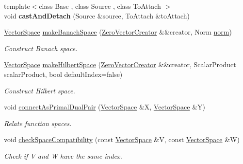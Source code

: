 \begin{DoxyCompactItemize}
\item 
\hypertarget{namespaceSpacy_a9e6018674d6169a33a2fa75a35e2fef3}{{\footnotesize template$<$class Base , class Source , class To\-Attach $>$ }\\void {\bfseries cast\-And\-Detach} (\-Source \&source, \-To\-Attach \&to\-Attach)}\label{namespaceSpacy_a9e6018674d6169a33a2fa75a35e2fef3}

\item 
\hypertarget{namespaceSpacy_a0b66c8f2345b693504180dc7fb187958}{\hyperlink{classSpacy_1_1VectorSpace}{\-Vector\-Space} \hyperlink{namespaceSpacy_a0b66c8f2345b693504180dc7fb187958}{make\-Banach\-Space} (\hyperlink{classSpacy_1_1ZeroVectorCreator}{\-Zero\-Vector\-Creator} \&\&creator, \-Norm \hyperlink{namespaceSpacy_a86a4fc266aa19a07b0af16388907354b}{norm})}\label{namespaceSpacy_a0b66c8f2345b693504180dc7fb187958}

\begin{DoxyCompactList}\small\item\em \-Construct \-Banach space. \end{DoxyCompactList}\item 
\hypertarget{namespaceSpacy_a927756dd42df3e79c302df1f8f635b65}{\hyperlink{classSpacy_1_1VectorSpace}{\-Vector\-Space} \hyperlink{namespaceSpacy_a927756dd42df3e79c302df1f8f635b65}{make\-Hilbert\-Space} (\hyperlink{classSpacy_1_1ZeroVectorCreator}{\-Zero\-Vector\-Creator} \&\&creator, \-Scalar\-Product scalar\-Product, bool default\-Index=false)}\label{namespaceSpacy_a927756dd42df3e79c302df1f8f635b65}

\begin{DoxyCompactList}\small\item\em \-Construct \-Hilbert space. \end{DoxyCompactList}\item 
void \hyperlink{namespaceSpacy_a72844d3d381380c382cd9dce912e2664}{connect\-As\-Primal\-Dual\-Pair} (\hyperlink{classSpacy_1_1VectorSpace}{\-Vector\-Space} \&\-X, \hyperlink{classSpacy_1_1VectorSpace}{\-Vector\-Space} \&\-Y)
\begin{DoxyCompactList}\small\item\em \-Relate function spaces. \end{DoxyCompactList}\item 
void \hyperlink{namespaceSpacy_aae18423491adef608743902f1c40844e}{check\-Space\-Compatibility} (const \hyperlink{classSpacy_1_1VectorSpace}{\-Vector\-Space} \&\-V, const \hyperlink{classSpacy_1_1VectorSpace}{\-Vector\-Space} \&\-W)
\begin{DoxyCompactList}\small\item\em \-Check if \-V and \-W have the same index. \end{DoxyCompactList}\end{DoxyCompactItemize}


